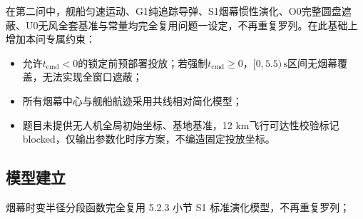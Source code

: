 \documentclass[withoutpreface,bwprint]{cumcmthesis}
\begin{document}
在第二问中，舰船匀速运动、G1纯追踪导弹、S1烟幕惯性演化、O0完整圆盘遮蔽、U0无风全套基准与常量均完全复用问题一设定，不再重复罗列。在此基础上增加本问专属约束：
\begin{itemize}
	\item 允许$t_{\text{cmd}}<0$的锁定前预部署投放；若强制$t_{\text{cmd}}\ge0$，$[0,5.5)\,\text{s}$区间无烟幕覆盖，无法实现全窗口遮蔽；
	\item 所有烟幕中心与舰船航迹采用共线相对简化模型；
	\item 题目未提供无人机全局初始坐标、基地基准，12 km飞行可达性校验标记blocked，仅输出参数化时序方案，不编造固定投放坐标。
\end{itemize}


\subsection{模型建立}

烟幕时变半径分段函数完全复用 5.2.3 小节 S1 标准演化模型，不再重复罗列；

\end{document}
